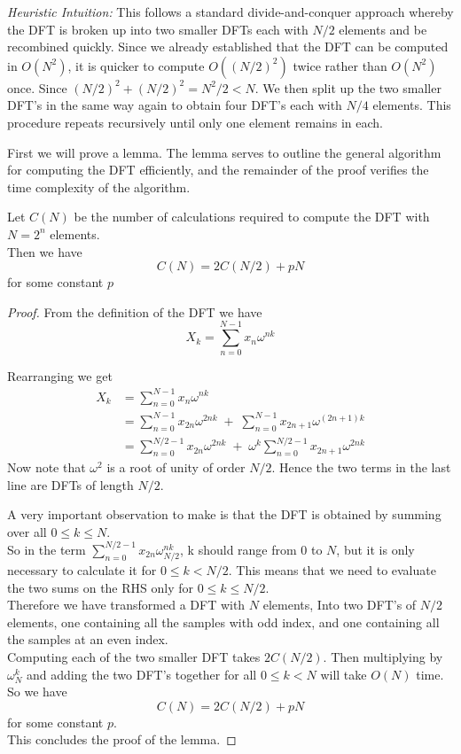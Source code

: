 \noindent\textit{Heuristic Intuition:}\lvm
This follows a standard divide-and-conquer approach whereby the DFT is broken up into two smaller DFTs each with $N/2$ elements and be recombined quickly. Since we already established that the DFT can be computed in $O(N^2)$, it is quicker to compute $O((N/2)^2)$ twice rather than $O(N^2)$ once. Since $(N/2)^2 + (N/2)^2 = N^2/2 < N$. We then split up the two smaller DFT's in the same way again to obtain four DFT's each with $N/4$ elements. This procedure repeats recursively until only one element remains in each.

First we will prove a lemma. The lemma serves to outline the general algorithm for computing the DFT efficiently, and the remainder of the proof verifies the time complexity of the algorithm.

\begin{lemma}
    Let $C(N)$ be the number of calculations required to compute the DFT with $N = 2^n$ elements.\\
    Then we have
    \begin{equation}
        C(N) = 2 C(N/2) + pN \label{eq:fftlem}
    \end{equation}
    for some constant $p$
\end{lemma}

\begin{proof}
From the definition of the DFT we have
\[
    X_k = \sum^{N-1}_{n=0}x_n\omega^{nk}
\]

Rearranging we get
\begin{align}
    X_k
    &= \sum^{N-1}_{n=0}x_n\omega^{nk} \nonumber\\
    &= \sum^{N-1}_{n=0}x_{2n}\omega^{2nk} \;+\; \sum^{N-1}_{n=0}x_{2n+1} \omega^{(2n+1)k} \nonumber\\
    &= \sum^{N/2-1}_{n=0}x_{2n}\omega^{2nk} \;+\; \omega^k \sum^{N/2-1}_{n=0}x_{2n+1}\omega^{2nk} \label{eq:keystep}
\end{align}
Now note that $\omega^2$ is a root of unity of order $N/2$. Hence the two terms in the last line are DFTs of length $N/2$.

A very important observation to make is that the DFT is obtained by summing over all $0\leq k \leq N$.\\

So in the term $\sum^{N/2-1}_{n=0}x_{2n}\omega^{nk}_{N/2}$, k should range from 0 to $N$, but it is only necessary to calculate it for $0 \leq k < N/2$. This means that we need to evaluate the two sums on the RHS only for $0 \leq k \leq N/2$.\\

Therefore we have transformed a DFT with $N$ elements, Into two DFT's of $N/2$ elements, one containing all the samples with odd index, and one containing all the samples at an even index.\\
Computing each of the two smaller DFT takes $2C(N/2)$. Then multiplying by $\omega^k_N$ and adding the two DFT's together for all $0 \leq k < N$ will take $O(N)$ time. \\
So we have
\[
    C(N) = 2 C(N/2) + pN \label{eq:recurse}
\]
for some constant $p$.\\
This concludes the proof of the lemma.
\end{proof}

